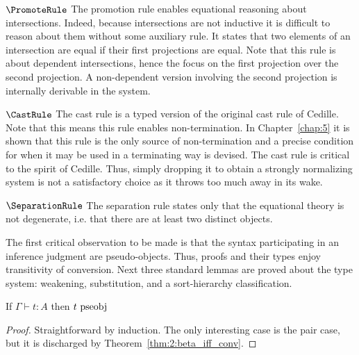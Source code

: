 $\PromoteRule$ The promotion rule enables equational reasoning about intersections.
Indeed, because intersections are not inductive it is difficult to reason about them without some auxiliary rule.
It states that two elements of an intersection are equal if their first projections are equal.
Note that this rule is about dependent intersections, hence the focus on the first projection over the second projection.
A non-dependent version involving the second projection is internally derivable in the system.

$\CastRule$ The cast rule is a typed version of the original cast rule of Cedille.
Note that this means this rule enables non-termination.
In Chapter~\ref{chap:5} it is shown that this rule is the only source of non-termination and a precise condition for when it may be used in a terminating way is devised.
The cast rule is critical to the spirit of Cedille.
Thus, simply dropping it to obtain a strongly normalizing system is not a satisfactory choice as it throws too much away in its wake.

$\SeparationRule$ The separation rule states only that the equational theory is not degenerate, i.e. that there are at least two distinct objects.



The first critical observation to be made is that the syntax participating in an inference judgment are pseudo-objects.
Thus, proofs and their types enjoy transitivity of conversion.
Next three standard lemmas are proved about the type system: weakening, substitution, and a sort-hierarchy classification.

\begin{lemma}
    If $\Gamma \vdash t : A$ then $t~\textnormal{pseobj}$
    \label{lem:2:infer_implies_pseobj}
\end{lemma}
\begin{proof}
    Straightforward by induction.
    The only interesting case is the pair case, but it is discharged by Theorem~\ref{thm:2:beta_iff_conv}.
\end{proof}

